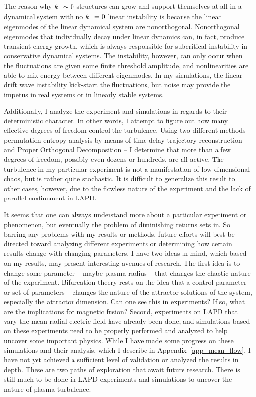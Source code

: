 The reason why $k_\parallel \sim 0$ structures can grow and support themselves at all in a dynamical system with no $k_\parallel = 0$ linear instability is because the linear eigenmodes of the linear
dynamical system are nonorthogonal. Nonorthogonal eigenmodes that individually decay under linear dynamics can, in fact, produce transient energy growth, which is always responsible for
subcritical instability in conservative dynamical systems. The instability, however, can only occur when the fluctuations are given some finite threshold amplitude, and nonlinearities are able
to mix energy between different eigenmodes. In my simulations, the linear drift wave instability kick-start the fluctuations, but noise may provide the impetus
in real systems or in linearly stable systems.

Additionally, I analyze the experiment and simulations in regards to their deterministic character. In other words, I attempt to figure out how many effective degrees of freedom control
the turbulence. Using two different methods -- permutation entropy analysis by means of time delay trajectory reconstruction and Proper Orthogonal Decomposition -- I determine that
more than a few degrees of freedom, possibly even dozens or hundreds, are all active. The turbulence in my particular experiment is not a manifestation of low-dimensional chaos, but is
rather quite stochastic. It is difficult to generalize this result to other cases, however, due to the flowless nature of the experiment and the lack of parallel confinement in LAPD.

It seems that one can always understand more about a particular experiment or phenomenon, but eventually the problem of diminishing returns sets in. So barring any problems with my results or methods,
future efforts will best be directed toward analyzing different experiments or determining how certain results change with changing parameters. I have two ideas in mind, which based on my results,
may present interesting avenues of research. The first idea is to change some parameter -- maybe plasma radius -- that changes the chaotic nature of the experiment. Bifurcation theory rests
on the idea that a control parameter -- or set of parameters -- changes the nature of the attractor solutions of the system, especially the attractor dimension. 
Can one see this in experiments? If so, what are the implications for magnetic fusion? Second, experiments on LAPD that vary the mean radial electric
field have already been done, and simulations based on these experiments need to be properly performed and analyzed to help uncover some important physics. While I have made some progress
on these simulations and their analysis, which I describe in Appendix~\ref{app_mean_flow}, I have not yet achieved a sufficient level of validation or analyzed the results in depth.
These are two paths of exploration that await future research. There is still much to be done in LAPD experiments and simulations to uncover the nature of plasma turbulence.
